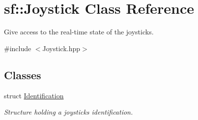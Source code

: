 \hypertarget{classsf_1_1_joystick}{}\section{sf\+:\+:Joystick Class Reference}
\label{classsf_1_1_joystick}


Give access to the real-\/time state of the joysticks.  




{\ttfamily \#include $<$Joystick.\+hpp$>$}

\subsection*{Classes}
\begin{DoxyCompactItemize}
\item 
struct \mbox{\hyperlink{structsf_1_1_joystick_1_1_identification}{Identification}}
\begin{DoxyCompactList}\small\item\em Structure holding a joystick\textquotesingle{}s identification. \end{DoxyCompactList}\end{DoxyCompactItemize}

